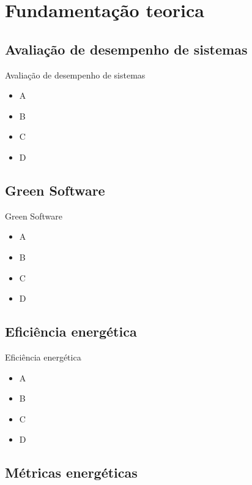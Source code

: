 \section{Fundamentação teorica}

\subsection{Avaliação de desempenho de sistemas}
\begin{frame}{Avaliação de desempenho de sistemas}
    \begin{itemize}
        \item A
        \item B
        \item C 
        \item D 
    \end{itemize}
\end{frame}

\subsection{Green Software}
\begin{frame}{Green Software}
    \begin{itemize}
        \item A
        \item B
        \item C 
        \item D 
    \end{itemize}
\end{frame}

\subsection{Eficiência energética}
\begin{frame}{Eficiência energética}
    \begin{itemize}
        \item A
        \item B
        \item C 
        \item D 
    \end{itemize}
\end{frame}

\subsection{Métricas energéticas}


